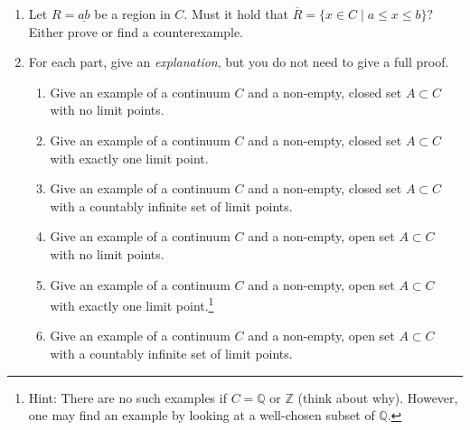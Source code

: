 \documentclass[11pt]{article}
\newcommand{\bbQ}{\mathbb{Q}}
\newcommand{\bbZ}{\mathbb{Z}}
\renewcommand{\emptyset}{\O}
\renewcommand{\_}[1]{\underline{ #1 }}
\theoremstyle{definition}
\numberwithin{equation}{subsection}
\begin{document}
\begin{enumerate}
\begin{proof}
Similarly, for $\bbQ \setminus X$, we want to show that for every $x \in \bbQ \setminus X$, there exists some $y \in \bbQ \setminus X$ such that $y <x$. Consider $y = \frac{a - \frac{1}{4a}}{b}$. We want to show that $(a - \frac{1}{4a})^2 > 2b^2$. Expanding, we want to show that $a^2 + \frac{1}{16a^2}-\frac{1}{2} > 2b^2$. Analogously to the above, we have that $a^2 + 1 \geq 2b^2$. Hence, we want to show that $a^2 - 2b^2 > \frac{1}{2} - \frac{1}{16a^2}$. We know that $LHS \geq 1$, and it is therefore trivial that $\frac{1}{2} - \frac{1}{16a^2} < 1$. This proves that $\bbQ \setminus X$ is open, i.e., $X$ is closed.

Since $X$ is clopen and $X \neq \emptyset$, $X \neq \bbQ$, this is how we know that $\bbQ$ is disconnected.

\renewcommand\qedsymbol{QED}
\end{proof}



\item Let $R=\underline{ab}$ be a region in $C.$  Must it hold that $\overline{R}=\{x\in C\mid a\leq x\leq b\}?$ Either prove or find a counterexample.

\item
For each part, give an {\em explanation}, but you do not need to give a full proof.
\begin{enumerate}
	\item Give an example of a continuum $C$ and a non-empty, closed set $A \subset C$ with no limit points.
	\item Give an example of a continuum $C$ and a non-empty, closed set $A \subset C$ with exactly one limit point.
	\item Give an example of a continuum $C$ and a non-empty, closed set $A \subset C$ with a countably infinite set of limit points.
	\item Give an example of a continuum $C$ and a non-empty, open set $A \subset C$ with no limit points.
	\item Give an example of a continuum $C$ and a non-empty,  open set $A \subset C$ with exactly one limit point.\footnote{Hint: There are no such examples if $C = \bbQ$ or $\bbZ$ (think about why).  However, one may find an example by looking at a well-chosen subset of $\bbQ$.}
	\item Give an example of a continuum $C$ and a non-empty,  open set $A \subset C$ with a countably infinite set of limit points.
\end{enumerate}




\end{enumerate}
\end{document}

